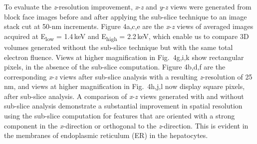 \documentclass{article}
\begin{document}
To evaluate the \emph{z}-resolution improvement, \emph{x}-\emph{z} and \emph{y}-\emph{z} views were generated from block face images before and after applying the sub-slice technique to an image stack cut at 50-nm increments. Figure 4a,c,e are the \emph{x}-\emph{z} views of averaged images acquired at E\textsubscript{low} = 1.4\,keV and E\textsubscript{high} = 2.2\,keV, which enable us to compare 3D volumes generated without the sub-slice technique but with the same total electron fluence. Views at higher magnification in Fig.~4g,i,k show rectangular pixels, in the absence of the sub-slice computation. Figure 4b,d,f are the corresponding \emph{x}-\emph{z} views after sub-slice analysis with a resulting \emph{z}-resolution of 25\,nm, and views at higher magnification in Fig.~4h,j,l now display square pixels, after sub-slice analysis. A comparison of \emph{x}-\emph{z} views generated with and without sub-slice analysis demonstrate a substantial improvement in spatial resolution using the sub-slice computation for features that are oriented with a strong component in the \emph{x}-direction or orthogonal to the \emph{z}-direction. This is evident in the membranes of endoplasmic reticulum (ER) in the hepatocytes.
\end{document}
